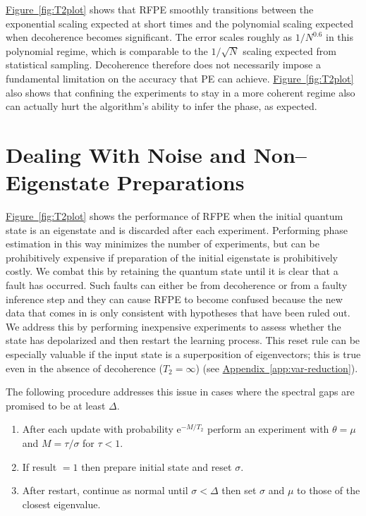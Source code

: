 \documentclass[aps,pra,amsmath,twocolumn,amssymb,superscriptaddress]{revtex4-1}
\newcommand{\app}[1]{\hyperref[app:#1]{Appendix~\ref*{app:#1}}}
\newcommand{\fig}[1]{\hyperref[fig:#1]{Figure~\ref*{fig:#1}}}
\newcommand{\ee}{\mathrm{e}}
\begin{document}
\fig{T2plot} shows that RFPE smoothly transitions between the exponential scaling expected at short times and the polynomial scaling expected when decoherence becomes significant.  The error scales roughly as $1/N^{0.6}$ in this polynomial regime, which is comparable to the $1/\sqrt{N}$ scaling expected from statistical sampling.  Decoherence therefore does not necessarily impose a fundamental limitation on the accuracy that PE can achieve.  \fig{T2plot} also shows that confining the experiments to stay in a more coherent regime also can actually hurt the algorithm's ability to infer the phase, as expected.

\section{Dealing With Noise and Non--Eigenstate Preparations}
\label{sec:track}

\fig{T2plot} shows the performance of RFPE when the initial quantum state is an eigenstate and is discarded after each experiment.  Performing phase estimation in this way minimizes the number of experiments, but can be prohibitively expensive if preparation of the initial eigenstate is prohibitively costly.  We combat this by retaining the quantum state until it is clear that
a fault has occurred.  Such faults can either be from decoherence or from a faulty inference step and they
 can cause RFPE to become confused because the new data that comes in is only consistent with hypotheses that have been ruled out.
We address this by performing inexpensive experiments to assess whether the state has depolarized and then restart the learning process.
This reset rule can be especially valuable if the input state is a superposition of eigenvectors; this is true
even in the absence of decoherence ($T_2=\infty$) (see \app{var-reduction}).

The following procedure addresses this issue in cases where the spectral gaps are promised to be at least $\Delta$.
\begin{enumerate}
\item After each update with probability $\ee^{-M/T_2}$ perform an experiment with $\theta=\mu$ and $M=\tau/\sigma$ for $\tau< 1$.
\item If result $=1$ then prepare initial state and reset $\sigma$.
\item After restart, continue as normal until $\sigma<\Delta$ then set $\sigma$ and $\mu$ to those of the closest eigenvalue.
\end{enumerate}
\end{document}
